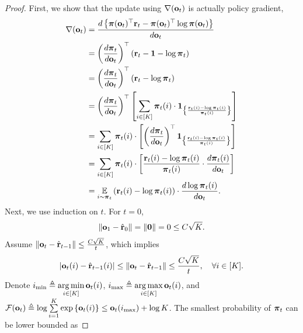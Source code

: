 \documentclass[10pt]{article}
\begin{document}
\begin{proof}
First, we show that the update using $\nabla({\mathbf{o}}_t)$ is actually policy gradient,
\begin{equation*}
\begin{split}
    \nabla({\mathbf{o}}_t) &= \frac{d \left\{ {\boldsymbol{\pi}}({\mathbf{o}}_t)^\top {\mathbf{r}}_t - {\boldsymbol{\pi}}({\mathbf{o}}_t)^\top \log{{\boldsymbol{\pi}}({\mathbf{o}}_t)} \right\} }{d {\mathbf{o}}_t} \\
    &= \left( \frac{d {\boldsymbol{\pi}}_t}{d {\mathbf{o}}_t} \right)^\top \left( {\mathbf{r}}_t - {\mathbf{1}} - \log{{\boldsymbol{\pi}}_t} \right) \\
    &= \left( \frac{d {\boldsymbol{\pi}}_t}{d {\mathbf{o}}_t} \right)^\top \left( {\mathbf{r}}_t - \log{{\boldsymbol{\pi}}_t} \right) \\
    &= \left( \frac{d {\boldsymbol{\pi}}_t}{d {\mathbf{o}}_t} \right)^\top \left[ \sum\limits_{i \in [K]}{ {\boldsymbol{\pi}}_t(i) \cdot {\mathbf{1}}_{ \left\{ \frac{{\mathbf{r}}_t(i) - \log{{\boldsymbol{\pi}}_t(i)} }{{\boldsymbol{\pi}}_t(i)} \right\} } } \right]  \\
    &= \sum\limits_{i \in [K]}{ {\boldsymbol{\pi}}_t(i) \cdot \left[ \left( \frac{d {\boldsymbol{\pi}}_t}{d {\mathbf{o}}_t} \right)^\top {\mathbf{1}}_{ \left\{ \frac{{\mathbf{r}}_t(i) - \log{{\boldsymbol{\pi}}_t(i)} }{{\boldsymbol{\pi}}_t(i)} \right\} } \right] } \\
    &= \sum\limits_{i \in [K]}{ {\boldsymbol{\pi}}_t(i) \cdot \left[ \frac{{\mathbf{r}}_t(i) - \log{{\boldsymbol{\pi}}_t(i)} }{{\boldsymbol{\pi}}_t(i)} \cdot \frac{d {\boldsymbol{\pi}}_t(i)}{d {\mathbf{o}}_t}  \right] } \\
    &= \operatorname*{{\mathbb{E}}}\limits_{i \sim {\boldsymbol{\pi}}_t}{ \left( {\mathbf{r}}_t(i) - \log{{\boldsymbol{\pi}}_t(i)} \right) \cdot \frac{d \log{{\boldsymbol{\pi}}_t(i)} }{d {\mathbf{o}}_t} }.
\end{split}
\end{equation*}
Next, we use induction on $t$. For $t=0$,
\begin{equation*}
\begin{split}
    \left\| {\mathbf{o}}_{1} - \hat{{\mathbf{r}}}_0 \right\| = \left\| {\mathbf{0}} \right\| = 0 \le C \sqrt{K}.
\end{split}
\end{equation*}
Assume $\left\| {\mathbf{o}}_{t} - \hat{{\mathbf{r}}}_{t-1} \right\| \le \frac{C \sqrt{K}}{t}$, which implies
\begin{equation*}
\begin{split}
    \left| {\mathbf{o}}_{t}(i) - \hat{{\mathbf{r}}}_{t-1}(i) \right| \le \left\| {\mathbf{o}}_{t} - \hat{{\mathbf{r}}}_{t-1} \right\| \le \frac{C \sqrt{K}}{t}, \quad \forall i \in [K].
\end{split}
\end{equation*}
Denote $i_{\min} \triangleq \operatorname*{arg\,min}\limits_{i \in [K]}{{\mathbf{o}}_t(i)} $, $i_{\max} \triangleq \operatorname*{arg\,max}\limits_{i \in [K]}{{\mathbf{o}}_t(i)} $, and ${\mathcal{F}}({\mathbf{o}}_t) \triangleq \log{\sum\limits_{i = 1}^K{\exp\left\{ {\mathbf{o}}_t(i) \right\}} } \le {\mathbf{o}}_t(i_{\max}) + \log{K}$. The smallest probability of ${\boldsymbol{\pi}}_t$ can be lower bounded as

\end{proof}
\end{document}
